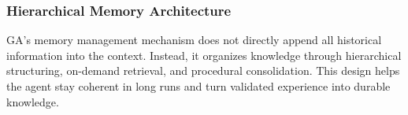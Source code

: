 

\subsubsection{Hierarchical Memory Architecture}
\label{sec:memory}
GA’s memory management mechanism does not directly append all historical information into the context. 
Instead, it organizes knowledge through hierarchical structuring, on-demand retrieval, and procedural consolidation.
This design helps the agent stay coherent in long runs and turn validated experience into durable knowledge.


